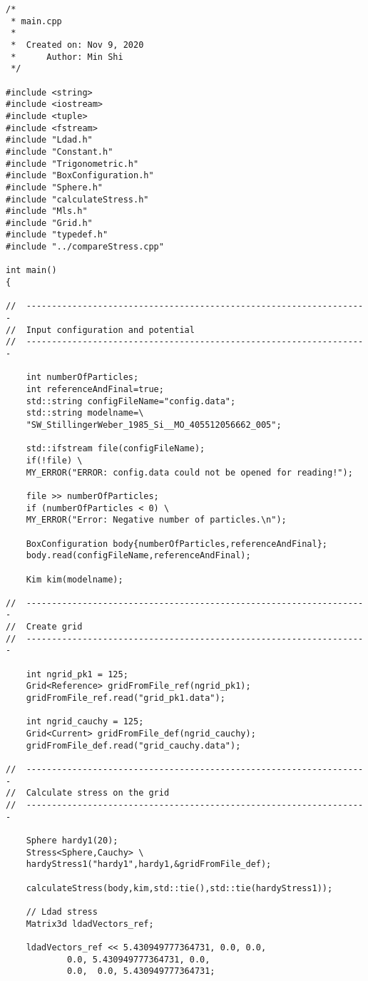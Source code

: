 \documentclass[authoryear]{elsarticle}
\begin{document}
\begin{Verbatim}[frame=single]
/*
 * main.cpp
 *
 *  Created on: Nov 9, 2020
 *      Author: Min Shi
 */

#include <string>
#include <iostream>
#include <tuple>
#include <fstream>
#include "Ldad.h"
#include "Constant.h"
#include "Trigonometric.h"
#include "BoxConfiguration.h"
#include "Sphere.h"
#include "calculateStress.h"
#include "Mls.h"
#include "Grid.h"
#include "typedef.h"
#include "../compareStress.cpp"

int main()
{

//	-------------------------------------------------------------------
//	Input configuration and potential
//	-------------------------------------------------------------------

	int numberOfParticles;
	int referenceAndFinal=true;
	std::string configFileName="config.data";
	std::string modelname=\
	"SW_StillingerWeber_1985_Si__MO_405512056662_005";

	std::ifstream file(configFileName);
	if(!file) \
	MY_ERROR("ERROR: config.data could not be opened for reading!");
	
	file >> numberOfParticles;
	if (numberOfParticles < 0) \
	MY_ERROR("Error: Negative number of particles.\n");

	BoxConfiguration body{numberOfParticles,referenceAndFinal};
	body.read(configFileName,referenceAndFinal);

	Kim kim(modelname);

//	-------------------------------------------------------------------
//	Create grid
//	-------------------------------------------------------------------

	int ngrid_pk1 = 125;
	Grid<Reference> gridFromFile_ref(ngrid_pk1);
	gridFromFile_ref.read("grid_pk1.data");

	int ngrid_cauchy = 125;
	Grid<Current> gridFromFile_def(ngrid_cauchy);
	gridFromFile_def.read("grid_cauchy.data");

//	-------------------------------------------------------------------
//	Calculate stress on the grid
//	-------------------------------------------------------------------

	Sphere hardy1(20);
	Stress<Sphere,Cauchy> \
	hardyStress1("hardy1",hardy1,&gridFromFile_def);

	calculateStress(body,kim,std::tie(),std::tie(hardyStress1));

	// Ldad stress
	Matrix3d ldadVectors_ref;

	ldadVectors_ref << 5.430949777364731, 0.0, 0.0, 
			0.0, 5.430949777364731, 0.0,
			0.0,  0.0, 5.430949777364731;   


\end{Verbatim}
\end{document}

